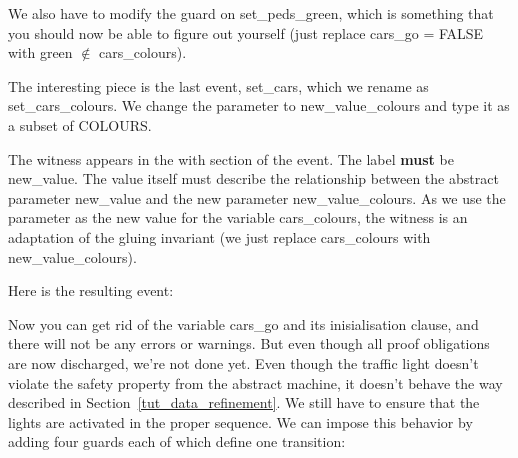 We also have to modify the guard on \textsf{set\_peds\_green}, which is something that you should now be able to figure out yourself (just replace \textsf{cars\_go = FALSE} with \textsf{green} $\notin$ \textsf{cars\_colours}).

The interesting piece is the last event, \textsf{set\_cars}, which we rename as \textsf{set\_cars\_colours}.  We change the parameter to \textsf{new\_value\_colours} and type it as a subset of \textsf{COLOURS}.

The witness appears in the \textsf{with} section of the event.  The label \textbf{must} be \textsf{new\_value}.  The value itself must describe the relationship between the abstract parameter \textsf{new\_value} and the new parameter \textsf{new\_value\_colours}.  As we use the parameter as the new value for the variable \textsf{cars\_colours}, the witness is an adaptation of the gluing invariant (we just replace \textsf{cars\_colours} with \textsf{new\_value\_colours}).


Here is the resulting event:


Now you can get rid of the variable \textsf{cars\_go} and its inisialisation clause, and there will not be any errors or warnings. But even though all proof obligations are now discharged, we're not done yet. Even though the traffic light doesn't violate the safety property from the abstract machine, it doesn't behave the way described in Section~\ref{tut_data_refinement}.  We still have to ensure that the lights are activated in the proper sequence.  We can impose this behavior by adding four guards each of which define one transition:

